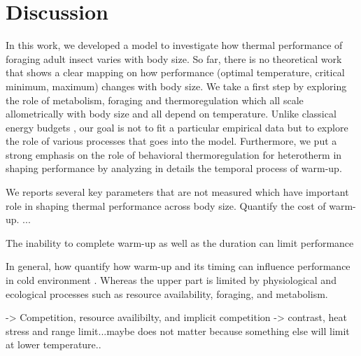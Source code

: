 \section*{Discussion}
In this work, we developed a model to investigate how thermal performance of foraging adult insect varies with body size.
So far, there is no theoretical work that shows a clear mapping on how performance (optimal temperature, critical minimum, maximum) changes with body size. 
We take a first step by exploring the role of metabolism, foraging and thermoregulation which all scale allometrically with body size and all depend on temperature.
Unlike classical energy budgets \citep[e.g.,][]{Kooijman2009}, our goal is not to fit a particular empirical data but to explore the role of various processes that goes into the model.
Furthermore, we put a strong emphasis on the role of behavioral thermoregulation for heterotherm in shaping performance by analyzing in details the temporal process of warm-up.

We reports several key parameters that are not measured which have important role in shaping thermal performance across body size.
Quantify the cost of warm-up. 
...


The inability to complete warm-up as well as the duration can limit performance 


In general, how quantify how warm-up and its timing can influence performance in cold environment .
Whereas the upper part is limited by physiological and ecological processes such as resource availability, foraging, and metabolism.

-> Competition, resource availibilty, and implicit competition
-> contrast, heat stress and range limit...maybe does not matter because something else will limit at lower temperature..

